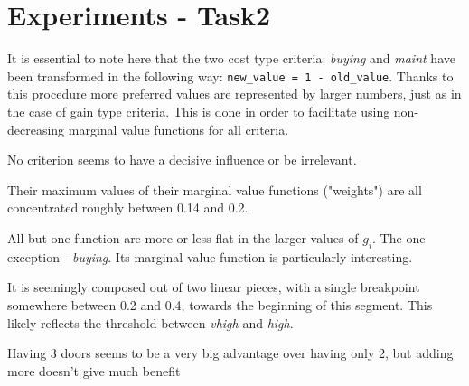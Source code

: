 \documentclass[../main.tex]{subfiles}
\begin{document}
\section{Experiments - Task2}

It is essential to note here that the two cost type criteria: \emph{buying} and \emph{maint}
have been transformed in the following way:
\verb|new_value = 1 - old_value|.
Thanks to this procedure more preferred values are represented by larger numbers,
just as in the case of gain type criteria.
This is done in order to facilitate using non-decreasing marginal value functions for all criteria.

No criterion seems to have a decisive influence or be irrelevant.

Their maximum values of their marginal value functions ("weights")
are all concentrated roughly between 0.14 and 0.2.

All but one function are more or less flat in the larger values of $g_i$.
The one exception - \emph{buying}. Its marginal value function is particularly interesting.

It is seemingly composed out of two linear pieces, with a single breakpoint
somewhere between 0.2 and 0.4, towards the beginning of this segment.
This likely reflects the threshold between \emph{vhigh} and \emph{high}.

Having 3 doors seems to be a very big advantage over having only 2,
but adding more doesn't give much benefit
\end{document}
